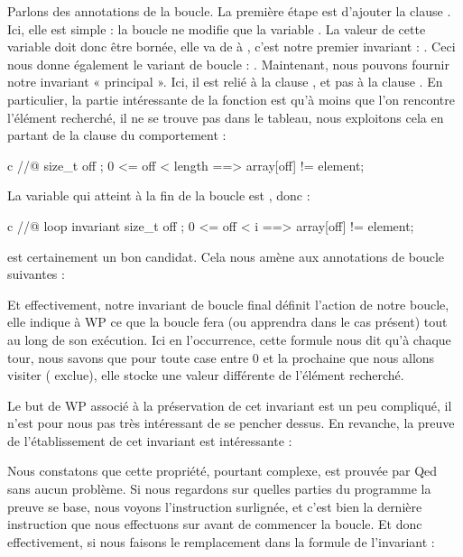 Parlons des annotations de la boucle. La première étape est d'ajouter la clause
. Ici, elle est simple : la boucle ne modifie que la
variable . La valeur de cette variable doit donc être bornée, elle
va de  à , c'est notre premier invariant :
. Ceci nous donne également le variant de boucle :
. Maintenant, nous pouvons fournir notre invariant
« principal ». Ici, il est relié à la clause , et pas à la
clause . En particulier, la partie intéressante de la
fonction est qu'à moins que l'on rencontre l'élément recherché, il ne se trouve
pas dans le tableau, nous exploitons cela en partant de la clause
 du comportement  :
\begin{CodeBlock}{c}
  //@ \forall size_t off ; 0 <= off < length ==> array[off] != element;
\end{CodeBlock}
La variable qui atteint  à la fin de la boucle est
, donc :
\begin{CodeBlock}{c}
  //@ loop invariant \forall size_t off ; 0 <= off < i ==> array[off] != element;
\end{CodeBlock}
est certainement un bon candidat. Cela nous amène aux annotations de boucle
suivantes :




Et effectivement, notre invariant de boucle final définit l'action de notre
boucle, elle indique à WP ce que la boucle fera (ou apprendra dans le cas
présent) tout au long de son exécution. Ici en l'occurrence, cette formule nous
dit qu'à chaque tour, nous savons que pour toute case entre 0 et la prochaine
que nous allons visiter ( exclue), elle stocke une valeur
différente de l'élément recherché.


Le but de WP associé à la préservation de cet invariant est un peu compliqué, il
n'est pour nous pas très intéressant de se pencher dessus. En revanche, la
preuve de l'établissement de cet invariant est intéressante :




Nous constatons que cette propriété, pourtant complexe, est prouvée par
Qed sans aucun problème. Si nous regardons sur quelles parties du programme la
preuve se base, nous voyons l'instruction  surlignée, et c'est
bien la dernière instruction que nous effectuons sur  avant de commencer
la boucle. Et donc effectivement, si nous faisons le remplacement dans la formule
de l'invariant :


